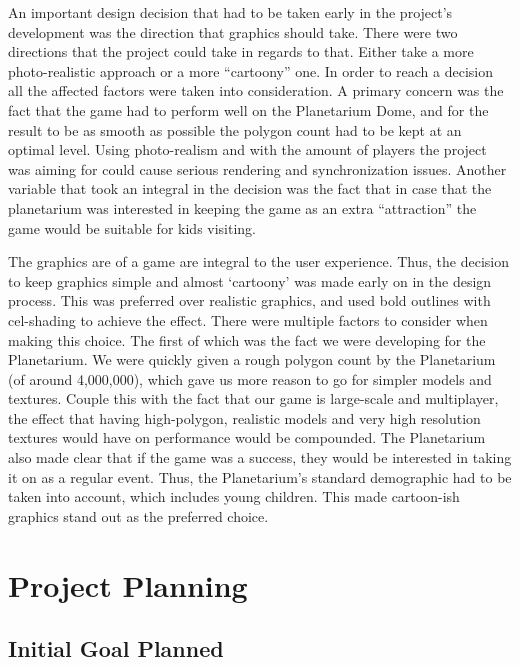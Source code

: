 \documentclass[11pt,a4paper]{article}
\begin{document}
        An important design decision that had to be taken early in the project's development was the direction that graphics should take. There were two directions that the project could take in regards to that. Either take a more photo-realistic approach or a more “cartoony” one. In order to reach a decision all the affected factors were taken into consideration. A primary concern was the fact that the game had to perform well on the Planetarium Dome, and for the result to be as smooth as possible the polygon count had to be kept at an optimal level. Using photo-realism and with the amount of players the project was aiming for could cause serious rendering and synchronization issues.
        Another variable that took an integral in the decision was the fact that in case that the planetarium was interested in keeping the game as an extra “attraction” the game would be suitable for kids visiting.


        The graphics are of a game are integral to the user experience. Thus, the decision to keep graphics simple and almost ‘cartoony’ was made early on in the design process. This was preferred over realistic graphics, and used bold outlines with cel-shading to achieve the effect. There were multiple factors to consider when making this choice. The first of which was the fact we were developing for the Planetarium. We were quickly given a rough polygon count by the Planetarium (of around 4,000,000), which gave us more reason to go for simpler models and textures. Couple this with the fact that our game is large-scale and multiplayer, the effect that having high-polygon, realistic models and very high resolution textures would have on performance would be compounded. The Planetarium also made clear that if the game was a success, they would be interested in taking it on as a regular event. Thus, the Planetarium’s standard demographic had to be taken into account, which includes young children. This made cartoon-ish graphics stand out as the preferred choice.  


\pagebreak



        \section{Project Planning}

        \subsection{Initial Goal Planned}
\end{document}
